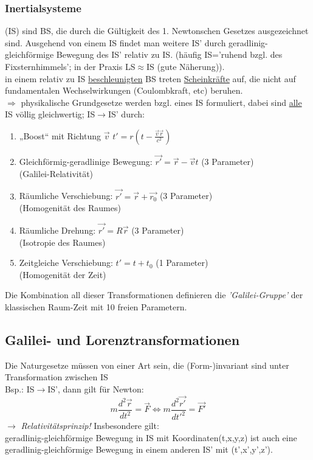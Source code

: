 \subsubsection{Inertialsysteme}
(IS) sind BS, die durch die Gültigkeit des 1. Newtonschen Gesetzes ausgezeichnet sind. Ausgehend von einem IS findet man weitere IS' durch geradlinig-gleichförmige Bewegung des IS' relativ zu IS. (häufig IS='ruhend bzgl. des Fixsternhimmels'; in der Praxis LS$\approx$IS (gute Näherung)).\\
in einem relativ zu IS \underline{beschleunigten} BS treten \underline{Scheinkräfte} auf, die nicht auf fundamentalen Wechselwirkungen (Coulombkraft, etc) beruhen.\\
$\Rightarrow$ physikalische Grundgesetze werden bzgl. eines IS
formuliert, dabei sind \underline{alle} IS völlig gleichwertig;
IS$\rightarrow$IS' durch:
\begin{enumerate}
\item „Boost“ mit Richtung $\vec{v}$ $t'=r(t-\frac{\vec{v}\vec{r}}{c^2})$
\item Gleichförmig-geradlinige Bewegung: $\vec{r'}=\vec{r}-\vec{v}t$ (3 Parameter)\\
(Galilei-Relativität)
\item Räumliche Verschiebung: $\vec{r'}=\vec{r}+\vec{r_0}$ (3 Parameter)\\
(Homogenität des Raumes)
\item Räumliche Drehung: $\vec{r'}=R\vec{r}$ (3 Parameter)\\
(Isotropie des Raumes)
\item Zeitgleiche Verschiebung: $t'=t+t_0$ (1 Parameter)\\
(Homogenität der Zeit)
\end{enumerate}
Die Kombination all dieser Transformationen definieren die
\emph{'Galilei-Gruppe'} der klassischen Raum-Zeit mit 10 freien
Parametern.
\subsection{Galilei- und Lorenztransformationen}
Die Naturgesetze müssen von einer Art sein, die (Form-)invariant sind unter Transformation zwischen IS\\
Bsp.: IS$\rightarrow$IS', dann gilt für Newton:\\
\begin{equation*}
  m\frac{d^2 \vec{r}}{dt^{2}}=\vec{F} \Leftrightarrow m\frac{d^{2}\vec{r'}}{dt'^{2}}=\vec{F'}
\end{equation*}
$\rightarrow$ \emph{Relativitätsprinzip!} Insbesondere gilt:\\
geradlinig-gleichförmige Bewegung in IS mit Koordinaten(t,x,y,z) ist
auch eine geradlinig-gleichförmige Bewegung in einem anderen IS' mit
(t',x',y',z').

